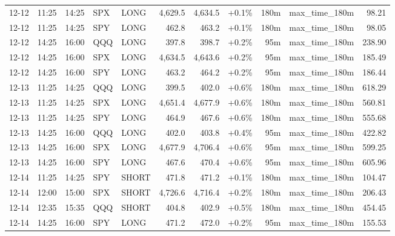 \documentclass[11pt,a4paper,twoside]{article}
\begin{document}
\begin{center}
\begin{longtable}{>{\color{txtmain}}l l l l l r r r r >{\color{txtmain}}l r}
12-12 & 11:25 & 14:25 & SPX & LONG & 4,629.5 & 4,634.5 & \textcolor{wingreen}{+0.1\%} & 180m & max\_time\_180m & \textcolor{wingreen}{98.21} \\
12-12 & 11:25 & 14:25 & SPY & LONG & 462.8 & 463.2 & \textcolor{wingreen}{+0.1\%} & 180m & max\_time\_180m & \textcolor{wingreen}{98.05} \\
12-12 & 14:25 & 16:00 & QQQ & LONG & 397.8 & 398.7 & \textcolor{wingreen}{+0.2\%} & 95m & max\_time\_180m & \textcolor{wingreen}{238.90} \\
12-12 & 14:25 & 16:00 & SPX & LONG & 4,634.5 & 4,643.6 & \textcolor{wingreen}{+0.2\%} & 95m & max\_time\_180m & \textcolor{wingreen}{185.49} \\
12-12 & 14:25 & 16:00 & SPY & LONG & 463.2 & 464.2 & \textcolor{wingreen}{+0.2\%} & 95m & max\_time\_180m & \textcolor{wingreen}{186.44} \\
12-13 & 11:25 & 14:25 & QQQ & LONG & 399.5 & 402.0 & \textcolor{wingreen}{+0.6\%} & 180m & max\_time\_180m & \textcolor{wingreen}{618.29} \\
12-13 & 11:25 & 14:25 & SPX & LONG & 4,651.4 & 4,677.9 & \textcolor{wingreen}{+0.6\%} & 180m & max\_time\_180m & \textcolor{wingreen}{560.81} \\
12-13 & 11:25 & 14:25 & SPY & LONG & 464.9 & 467.6 & \textcolor{wingreen}{+0.6\%} & 180m & max\_time\_180m & \textcolor{wingreen}{555.68} \\
12-13 & 14:25 & 16:00 & QQQ & LONG & 402.0 & 403.8 & \textcolor{wingreen}{+0.4\%} & 95m & max\_time\_180m & \textcolor{wingreen}{422.82} \\
12-13 & 14:25 & 16:00 & SPX & LONG & 4,677.9 & 4,706.4 & \textcolor{wingreen}{+0.6\%} & 95m & max\_time\_180m & \textcolor{wingreen}{599.25} \\
12-13 & 14:25 & 16:00 & SPY & LONG & 467.6 & 470.4 & \textcolor{wingreen}{+0.6\%} & 95m & max\_time\_180m & \textcolor{wingreen}{605.96} \\
12-14 & 11:25 & 14:25 & SPY & SHORT & 471.8 & 471.2 & \textcolor{wingreen}{+0.1\%} & 180m & max\_time\_180m & \textcolor{wingreen}{104.47} \\
12-14 & 12:00 & 15:00 & SPX & SHORT & 4,726.6 & 4,716.4 & \textcolor{wingreen}{+0.2\%} & 180m & max\_time\_180m & \textcolor{wingreen}{206.43} \\
12-14 & 12:35 & 15:35 & QQQ & SHORT & 404.8 & 402.9 & \textcolor{wingreen}{+0.5\%} & 180m & max\_time\_180m & \textcolor{wingreen}{454.45} \\
12-14 & 14:25 & 16:00 & SPY & LONG & 471.2 & 472.0 & \textcolor{wingreen}{+0.2\%} & 95m & max\_time\_180m & \textcolor{wingreen}{155.53} \\

\end{longtable}
\end{center}
\end{document}

